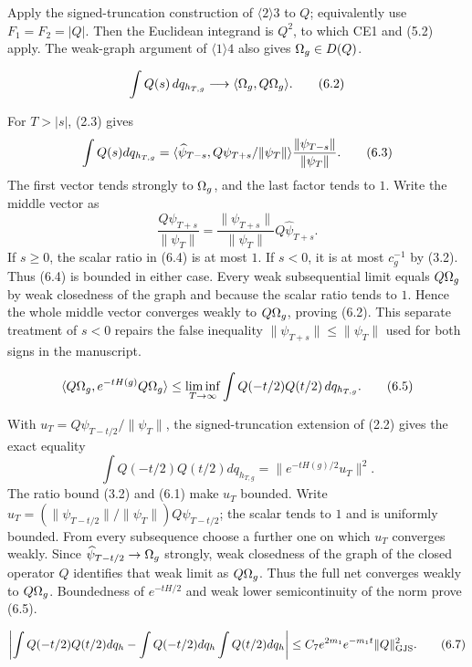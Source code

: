 \documentclass[11pt,a4paper]{article}
\begin{document}
\Because Apply the signed-truncation construction of $\langle2\rangle3$ to $Q$;
equivalently use $F_1=F_2=|Q|$.  Then the Euclidean integrand is $Q^2$, to
which CE1 and (5.2) apply.  The weak-graph argument of $\langle1\rangle4$ also gives
$\Omega_g\in D(Q)$.

\[
 \int Q(s)\,dq_{h_{T,g}}\longrightarrow\langle \Omega_g,Q\Omega_g\rangle.       \tag{6.2}
\]

\Because For $T>|s|$, (2.3) gives
\[
 \int Q(s)dq_{h_{T,g}}
 =\langle \widehat\psi_{T-s},Q\psi_{T+s}/\|\psi_T\|\rangle
   \frac{\|\psi_{T-s}\|}{\|\psi_T\|}.                            \tag{6.3}
\]
The first vector tends strongly to $\Omega_g$, and the last factor tends to $1$.
Write the middle vector as
\[
 \frac{Q\psi_{T+s}}{\|\psi_T\|}
 =\frac{\|\psi_{T+s}\|}{\|\psi_T\|}Q\widehat\psi_{T+s}.          \tag{6.4}
\]
If $s\geq0$, the scalar ratio in (6.4) is at most $1$.  If $s<0$, it is at
most $c_g^{-1}$ by (3.2).  Thus (6.4) is bounded in either case.  Every weak
subsequential limit equals $Q\Omega_g$ by weak closedness of the graph and because the
scalar ratio tends to $1$.  Hence the whole middle vector converges weakly to
$Q\Omega_g$, proving (6.2).  This separate treatment of $s<0$ repairs the false
inequality $\|\psi_{T+s}\|\leq\|\psi_T\|$ used for both signs in the manuscript.

\[
 \langle Q\Omega_g,e^{-tH(g)}Q\Omega_g\rangle
 \leq\liminf_{T\to\infty}
 \int Q(-t/2)Q(t/2)\,dq_{h_{T,g}}.                                 \tag{6.5}
\]

\Because With
$u_T=Q\psi_{T-t/2}/\|\psi_T\|$, the signed-truncation extension of (2.2) gives
the exact equality
\[
 \int Q(-t/2)Q(t/2)dq_{h_{T,g}}=\|e^{-tH(g)/2}u_T\|^2.             \tag{6.6}
\]
The ratio bound (3.2) and (6.1) make $u_T$ bounded.  Write
$u_T=(\|\psi_{T-t/2}\|/\|\psi_T\|)Q\widehat\psi_{T-t/2}$; the scalar tends to
$1$ and is uniformly bounded.  From every subsequence choose a further one on
which $u_T$ converges weakly.  Since
$\widehat\psi_{T-t/2}\to\Omega_g$ strongly, weak closedness of the graph of the
closed operator $Q$ identifies that weak limit as $Q\Omega_g$.  Thus the full net
converges weakly to $Q\Omega_g$.  Boundedness of $e^{-tH/2}$ and weak lower
semicontinuity of the norm prove (6.5).

\[
 \left|\int Q(-t/2)Q(t/2)dq_h
 -\int Q(-t/2)dq_h\int Q(t/2)dq_h\right|
 \leq C_7e^{2m_1}e^{-m_1t}\|Q\|_{\rm GJS}^2.                      \tag{6.7}
\]
\end{document}
